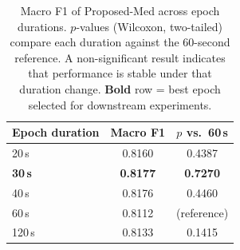 \begin{table}[ht]
    \centering
    \caption{Macro F1 of Proposed-Med across epoch durations.
        $p$-values (Wilcoxon, two-tailed) compare each duration against the 60-second reference.
        A non-significant result indicates that performance is stable under that duration change.
        \textbf{Bold} row = best epoch selected for downstream experiments.}
    \label{tab:epoch_duration}
    \begin{tabular}{lcc}
        \toprule
        Epoch duration & Macro F1 & $p$ vs.\ 60\,s \\
        \midrule
        20\,s & 0.8160 & 0.4387 \\
        \bfseries 30\,s & \bfseries 0.8177 & \bfseries 0.7270 \\
        40\,s & 0.8176 & 0.4460 \\
        60\,s & 0.8112 & (reference) \\
        120\,s & 0.8133 & 0.1415 \\
        \bottomrule
    \end{tabular}
\end{table}
